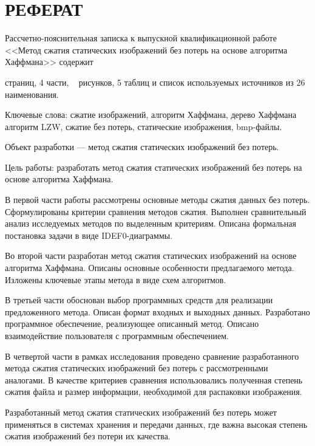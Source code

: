 \chapter*{РЕФЕРАТ}

Рассчетно-пояснительная записка к выпускной квалификационной работе <<Метод сжатия статических изображений без потерь на основе алгоритма Хаффмана>> содержит \begin{NoHyper}\pageref{LastPage}\end{NoHyper} страниц, 4 части, \totfig~ рисунков, 5 таблиц и список используемых источников из 26 наименования. 

Ключевые слова: сжатие изображений, алгоритм Хаффмана, дерево Хаффмана алгоритм LZW, сжатие без потерь, статические изображения, bmp-файлы.

Объект разработки --- метод сжатия статических изображений без потерь.

Цель работы: разработать метод сжатия статических изображений без потерь на основе алгоритма Хаффмана.

В первой части работы рассмотрены основные методы сжатия данных без потерь. Сформулированы критерии сравнения методов сжатия. Выполнен сравнительный анализ исследуемых методов по выделенным критериям. Описана формальная постановка задачи в виде IDEF0-диаграммы.

Во второй части разработан метод сжатия статических изображений на основе алгоритма Хаффмана. Описаны основные особенности предлагаемого метода. Изложены ключевые этапы метода в виде схем алгоритмов.

В третьей части обоснован выбор программных средств для реализации предложенного метода. Описан формат входных и выходных данных. Разработано программное обеспечение, реализующее описанный метод. Описано взаимодействие пользователя с программным обеспечением.

В четвертой части в рамках исследования проведено сравнение разработанного метода сжатия статических изображений без потерь с рассмотренными аналогами. В качестве критериев сравнения использовались полученная степень сжатия файла и размер информации, необходимой для распаковки изображения.

Разработанный метод сжатия статических изображений без потерь может применяться в системах хранения и передачи данных, где важна высокая степень сжатия изображений без потери их качества.
